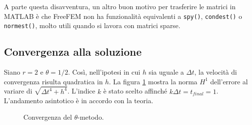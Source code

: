 \documentclass[a4paper]{article}
\newcommand{\normhone}[1]{\left\lVert#1\right\rVert_{H^1}}
\begin{document}
A parte questa disavventura, un altro buon motivo per trasferire le matrici
in MATLAB è che FreeFEM
non ha funzionalità equivalenti a \texttt{spy()}, \texttt{condest()}
o \texttt{normest()}, molto utili quando si lavora con matrici sparse.

\subsection{Convergenza alla soluzione}

Siano $r = 2$ e $\theta = 1/2$. Così, nell'ipotesi in cui $h$ sia uguale a $\Delta t$, la
velocità di convergenza risulta quadratica in $h$.
La figura \ref{fig:pb3-convergenza} mostra la norma $H^1$ dell'errore
al variare di $\sqrt{\Delta t^4 + h^4}$.
L'indice $k$ è stato scelto affinché $k \Delta t = t_{final} = 1$.
L'andamento asintotico è in accordo con la teoria.

\begin{figure}
\centering
{}
\caption{Convergenza del $\theta$-metodo.}
\label{fig:pb3-convergenza}
\end{figure}

%
%
\end{document}
